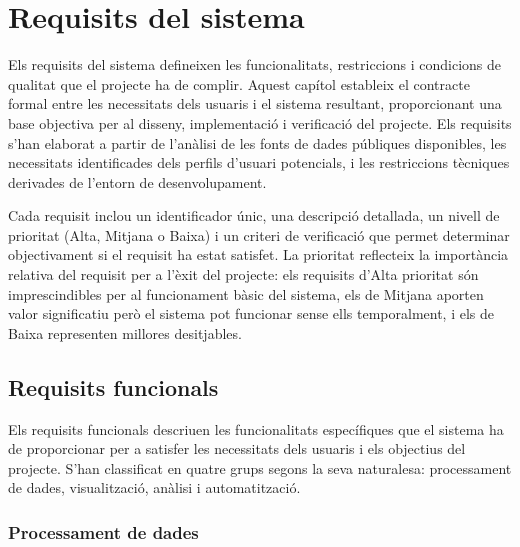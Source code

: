 

\chapter{Requisits del sistema}
\label{Ch:Requirements}

Els requisits del sistema defineixen les funcionalitats, restriccions i condicions de qualitat que el projecte ha de complir. Aquest capítol estableix el contracte formal entre les necessitats dels usuaris i el sistema resultant, proporcionant una base objectiva per al disseny, implementació i verificació del projecte. Els requisits s'han elaborat a partir de l'anàlisi de les fonts de dades públiques disponibles, les necessitats identificades dels perfils d'usuari potencials, i les restriccions tècniques derivades de l'entorn de desenvolupament.

Cada requisit inclou un identificador únic, una descripció detallada, un nivell de prioritat (Alta, Mitjana o Baixa) i un criteri de verificació que permet determinar objectivament si el requisit ha estat satisfet. La prioritat reflecteix la importància relativa del requisit per a l'èxit del projecte: els requisits d'Alta prioritat són imprescindibles per al funcionament bàsic del sistema, els de Mitjana aporten valor significatiu però el sistema pot funcionar sense ells temporalment, i els de Baixa representen millores desitjables.

\section{Requisits funcionals}

Els requisits funcionals descriuen les funcionalitats específiques que el sistema ha de proporcionar per a satisfer les necessitats dels usuaris i els objectius del projecte. S'han classificat en quatre grups segons la seva naturalesa: processament de dades, visualització, anàlisi i automatització.

\subsection{Processament de dades}

